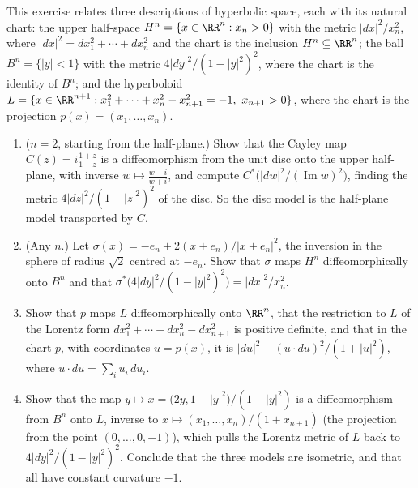 \begin{exercise}\label{riemannian-geometry:exercise-hyperbolic-models}
This exercise relates three descriptions of hyperbolic space, each with its natural chart: the upper half-space $H^n = \{x \in \RR^n : x_n > 0\}$ with the metric
$|dx|^2/x_n^2$, where $|dx|^2 = dx_1^2 + \cdots + dx_n^2$ and the chart is the inclusion $H^n \subseteq \RR^n$; the ball $B^n = \{|y| < 1\}$ with the metric $4|dy|^2/(1 - |y|^2)^2$, where the chart
is the identity of $B^n$; and the hyperboloid $L = \{x \in \RR^{n+1} : x_1^2 + \cdots + x_n^2 - x_{n+1}^2 = -1,\ x_{n+1} > 0\}$, where the chart is the projection
$p(x) = (x_1, \ldots, x_n)$.
\begin{enumerate}
\item ($n = 2$, starting from the half-plane.) Show that the Cayley map $C(z) = i\frac{1 + z}{1 - z}$ is a diffeomorphism from the unit disc onto the upper half-plane, with inverse
$w \mapsto \frac{w - i}{w + i}$, and compute $C^*\bigl(|dw|^2/(\operatorname{Im}w)^2\bigr)$, finding the metric $4|dz|^2/(1 - |z|^2)^2$ of the disc. So the disc model is the half-plane model
transported by $C$.
\item (Any $n$.) Let $\sigma(x) = -e_n + 2(x + e_n)/|x + e_n|^2$, the inversion in the sphere of radius $\sqrt2$ centred at $-e_n$. Show that $\sigma$ maps $H^n$ diffeomorphically onto $B^n$ and
that $\sigma^*\bigl(4|dy|^2/(1 - |y|^2)^2\bigr) = |dx|^2/x_n^2$.
\item Show that $p$ maps $L$ diffeomorphically onto $\RR^n$, that the restriction to $L$ of the Lorentz form $dx_1^2 + \cdots + dx_n^2 - dx_{n+1}^2$ is positive definite, and that in the chart $p$, with
coordinates $u = p(x)$, it is $|du|^2 - (u \cdot du)^2/(1 + |u|^2)$, where $u \cdot du = \sum_iu_i\,du_i$.
\item Show that the map $y \mapsto x = \bigl(2y, 1 + |y|^2\bigr)/(1 - |y|^2)$ is a diffeomorphism from $B^n$ onto $L$, inverse to $x \mapsto (x_1, \ldots, x_n)/(1 + x_{n+1})$ (the projection from
the point $(0, \ldots, 0, -1)$), which pulls the Lorentz metric of $L$ back to $4|dy|^2/(1 - |y|^2)^2$. Conclude that the three models are isometric, and that all have constant curvature $-1$.
\end{enumerate}
\end{exercise}


